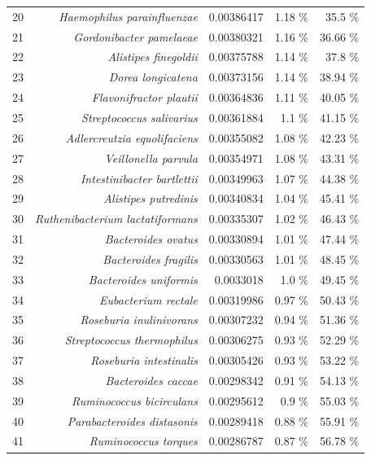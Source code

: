 \documentclass{article}
\begin{document}
\begin{table}
\begin{tabular}{|r|r|r|r|r|}
      20 & \textit{Haemophilus parainfluenzae} & 0.00386417 & 1.18 \% & 35.5 \% \\
      21 & \textit{Gordonibacter pamelaeae} & 0.00380321 & 1.16 \% & 36.66 \% \\
      22 & \textit{Alistipes finegoldii} & 0.00375788 & 1.14 \% & 37.8 \% \\
      23 & \textit{Dorea longicatena} & 0.00373156 & 1.14 \% & 38.94 \% \\
      24 & \textit{Flavonifractor plautii} & 0.00364836 & 1.11 \% & 40.05 \% \\
      25 & \textit{Streptococcus salivarius} & 0.00361884 & 1.1 \% & 41.15 \% \\
      26 & \textit{Adlercreutzia equolifaciens} & 0.00355082 & 1.08 \% & 42.23 \% \\
      27 & \textit{Veillonella parvula} & 0.00354971 & 1.08 \% & 43.31 \% \\
      28 & \textit{Intestinibacter bartlettii} & 0.00349963 & 1.07 \% & 44.38 \% \\
      29 & \textit{Alistipes putredinis} & 0.00340834 & 1.04 \% & 45.41 \% \\
      30 & \textit{Ruthenibacterium lactatiformans} & 0.00335307 & 1.02 \% & 46.43 \% \\
      31 & \textit{Bacteroides ovatus} & 0.00330894 & 1.01 \% & 47.44 \% \\
      32 & \textit{Bacteroides fragilis} & 0.00330563 & 1.01 \% & 48.45 \% \\
      33 & \textit{Bacteroides uniformis} & 0.0033018 & 1.0 \% & 49.45 \% \\
      34 & \textit{Eubacterium rectale} & 0.00319986 & 0.97 \% & 50.43 \% \\
      35 & \textit{Roseburia inulinivorans} & 0.00307232 & 0.94 \% & 51.36 \% \\
      36 & \textit{Streptococcus thermophilus} & 0.00306275 & 0.93 \% & 52.29 \% \\
      37 & \textit{Roseburia intestinalis} & 0.00305426 & 0.93 \% & 53.22 \% \\
      38 & \textit{Bacteroides caccae} & 0.00298342 & 0.91 \% & 54.13 \% \\
      39 & \textit{Ruminococcus bicirculans} & 0.00295612 & 0.9 \% & 55.03 \% \\
      40 & \textit{Parabacteroides distasonis} & 0.00289418 & 0.88 \% & 55.91 \% \\
      41 & \textit{Ruminococcus torques} & 0.00286787 & 0.87 \% & 56.78 \% \\

\end{tabular}
\end{table}
\end{document}
